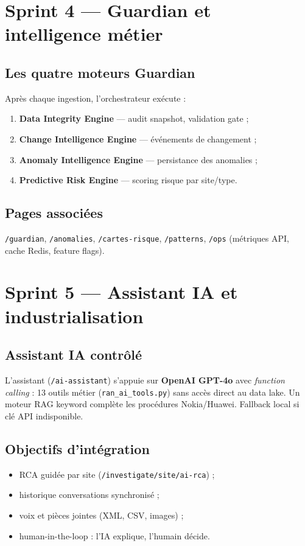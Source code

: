 \documentclass[12pt,a4paper]{report}
\begin{document}
\section{Sprint 4 — Guardian et intelligence métier}\label{sec:ch6-s4}

\subsection{Les quatre moteurs Guardian}
Après chaque ingestion, l'orchestrateur exécute :
\begin{enumerate}[leftmargin=*,itemsep=2pt]
    \item \textbf{Data Integrity Engine} — audit snapshot, validation gate ;
    \item \textbf{Change Intelligence Engine} — événements de changement ;
    \item \textbf{Anomaly Intelligence Engine} — persistance des anomalies ;
    \item \textbf{Predictive Risk Engine} — scoring risque par site/type.
\end{enumerate}

\subsection{Pages associées}
\texttt{/guardian}, \texttt{/anomalies}, \texttt{/cartes-risque}, \texttt{/patterns}, \texttt{/ops} (métriques API, cache Redis, feature flags).

\section{Sprint 5 — Assistant IA et industrialisation}\label{sec:ch6-s5}

\subsection{Assistant IA contrôlé}
L'assistant (\texttt{/ai-assistant}) s'appuie sur \textbf{OpenAI GPT-4o} avec \textit{function calling} : 13 outils métier (\texttt{ran\_ai\_tools.py}) sans accès direct au data lake. Un moteur RAG keyword complète les procédures Nokia/Huawei. Fallback local si clé API indisponible.

\subsection{Objectifs d'intégration}
\begin{itemize}[leftmargin=*,itemsep=2pt]
    \item RCA guidée par site (\texttt{/investigate/site/ai-rca}) ;
    \item historique conversations synchronisé ;
    \item voix et pièces jointes (XML, CSV, images) ;
    \item human-in-the-loop : l'IA explique, l'humain décide.
\end{itemize}
\end{document}
